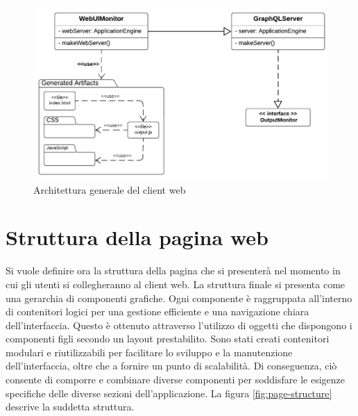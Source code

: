 \begin{figure}[htb]
	\centering
	\includegraphics[scale=0.7]{imgs/Web_Client_Structure.pdf}
	\caption{Architettura generale del client web}
	\label{fig:client-web-structure-graphics}
\end{figure}

\section{Struttura della pagina web} \label{section:page-structure}
Si vuole definire ora la struttura della pagina che si presenterà nel momento in cui gli utenti si collegheranno al client web. La struttura finale si presenta come una gerarchia di componenti grafiche. Ogni componente è raggruppata all'interno di contenitori logici per una gestione efficiente e una navigazione chiara dell'interfaccia. Questo è ottenuto attraverso l'utilizzo di oggetti che dispongono i componenti figli secondo un layout prestabilito. Sono stati creati contenitori modulari e riutilizzabili per facilitare lo sviluppo e la manutenzione dell'interfaccia, oltre che a fornire un punto di scalabilità. Di conseguenza, ciò consente di comporre e combinare diverse componenti per soddisfare le esigenze specifiche delle diverse sezioni dell'applicazione. La figura \ref{fig:page-structure} descrive la suddetta struttura.

